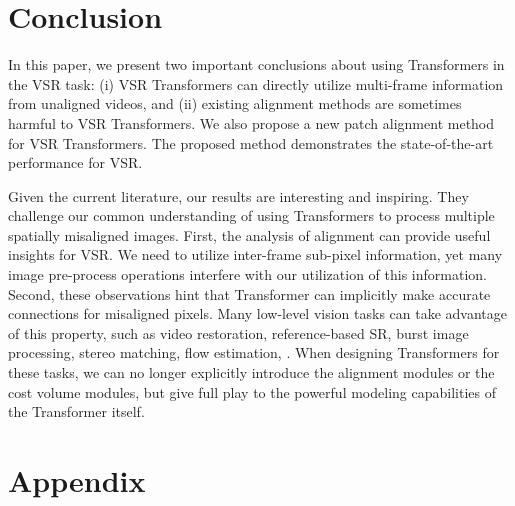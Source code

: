 \documentclass{article}
\begin{document}
\vspace{-3mm}
\section{Conclusion}
\label{sec:conclusion}
\vspace{-2mm}
In this paper, we present two important conclusions about using Transformers in the VSR task:
(i) VSR Transformers can directly utilize multi-frame information from unaligned videos,
and (ii) existing alignment methods are sometimes harmful to VSR Transformers.
We also propose a new patch alignment method for VSR Transformers. The proposed method demonstrates the state-of-the-art performance for VSR.


Given the current literature, our results are interesting and inspiring.
They challenge our common understanding of using Transformers to process multiple spatially misaligned images.
First, the analysis of alignment can provide useful insights for VSR.
We need to utilize inter-frame sub-pixel information, yet many image pre-process operations interfere with our utilization of this information.
Second, these observations hint that Transformer can implicitly make accurate connections for misaligned pixels.
Many low-level vision tasks can take advantage of this property, such as video restoration, reference-based SR, burst image processing, stereo matching, flow estimation, \etc.
When designing Transformers for these tasks, we can no longer explicitly introduce the alignment modules or the cost volume modules, but give full play to the powerful modeling capabilities of the Transformer itself.





{\small


}

\appendix

\section*{Appendix}

\vspace{-3mm}
\end{document}
